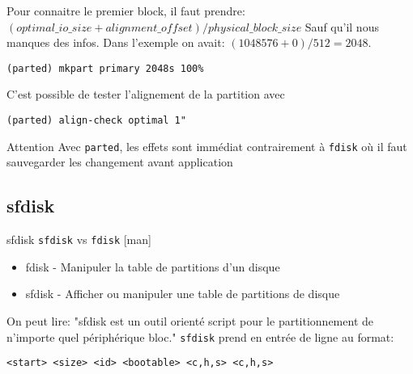\documentclass[compress]{beamer}
\begin{document}
\begin{frame}[fragile]
Pour connaitre le premier block, il faut prendre:\newline
$(optimal\_io\_size + alignment\_offset)/physical\_block\_size$ \newline
\newline
Sauf qu'il nous manques des infos.\newline
Dans l'exemple on avait:\newline
$(1048576 + 0) / 512 = 2048$.\newline
\begin{lstlisting}[style=shell]
(parted) mkpart primary 2048s 100%
\end{lstlisting}
C'est possible de tester l'alignement de la partition avec 
\begin{lstlisting}[style=shell]
(parted) align-check optimal 1"
\end{lstlisting}
\end{frame}

\begin{frame}[fragile]
\begin{block}{Attention}
Avec \texttt{parted}, les effets sont immédiat contrairement à \texttt{fdisk} où il faut sauvegarder les changement avant application
\end{block}
\end{frame}

\subsection{sfdisk}

\begin{frame}[fragile]{sfdisk}
\texttt{sfdisk} vs \texttt{fdisk} [man]
\begin{itemize}
	\item fdisk - Manipuler la table de partitions d'un disque
	\item sfdisk - Afficher ou manipuler une table de partitions de disque
\end{itemize}
On peut lire: "sfdisk est un outil orienté script pour le partitionnement de n’importe quel périphérique bloc."\newline
\newline
\texttt{sfdisk} prend en entrée de ligne au format:
\begin{lstlisting}[style=shell]
<start> <size> <id> <bootable> <c,h,s> <c,h,s>
\end{lstlisting}
\end{frame}
\end{document}
